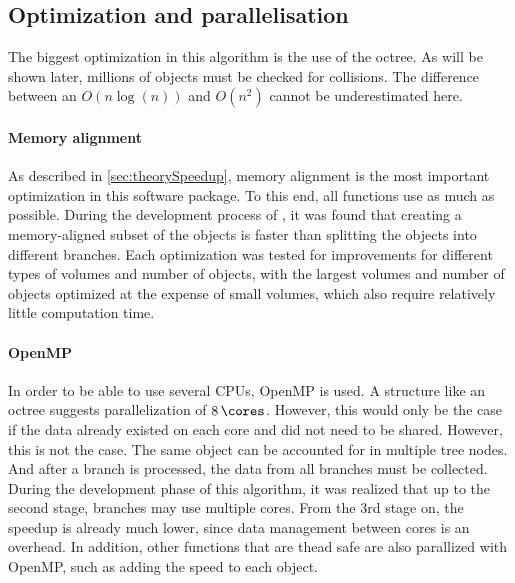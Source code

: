 \subsection{Optimization and parallelisation}\label{sec:modelOpt}
% 
The biggest optimization in this algorithm is the use of the octree.
As will be shown later, millions of objects must be checked for collisions.
The difference between an $O(n\log(n))$ and $O(n^2)$ cannot be underestimated here.
% 
%
\paragraph{Memory alignment}
As described in \cref{sec:theorySpeedup}, memory alignment is the most important optimization in this software package.
To this end, all functions use  as much as possible.
During the development process of , it was found that creating a memory-aligned subset of the objects is faster than splitting the objects into different branches.
Each optimization was tested for improvements for different types of volumes and number of objects, with the largest volumes and number of objects optimized at the expense of small volumes, which also require relatively little computation time.
%
%
\paragraph{OpenMP}
In order to be able to use several \acp{CPU}, \ac{OpenMP} is used.
A structure like an octree suggests parallelization of $\SI{8}{\cores}$.
However, this would only be the case if the data already existed on each core and did not need to be shared.
However, this is not the case.
The same object can be accounted for in multiple tree nodes.
And after a branch is processed, the data from all branches must be collected.
During the development phase of this algorithm, it was realized that up to the second stage, branches may use multiple cores. From the 3rd stage on, the speedup is already much lower, since data management between cores is an overhead.
In addition, other functions that are thead safe are also parallized with \ac{OpenMP}, such as adding the speed to each object.
%
%
%

